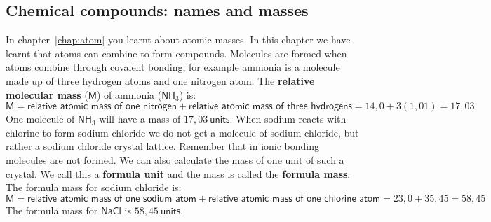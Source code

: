             \subsection*{Chemical compounds: names and masses}
            \nopagebreak
\label{m38689*uid97124}In chapter~\ref{chap:atom} you learnt about atomic masses. In this chapter we have learnt that atoms can combine to form compounds. Molecules are formed when atoms combine through covalent bonding, for example ammonia is a molecule made up of three hydrogen atoms and one nitrogen atom. The \textbf{relative molecular mass} ($\textsf{M}$) of ammonia ($\textsf{NH}_{3}$) is: \\
\begin{equation*}
 \textsf{M} = \textsf{relative atomic mass of one nitrogen} + \textsf{relative atomic mass of three hydrogens}
= 14,0 + 3(1,01) 
= 17,03
\end{equation*}
One molecule of $\textsf{NH}_{3}$ will have a  mass of $17,03~\textsf{units}$. When sodium reacts with chlorine to form sodium chloride we do not get a molecule of sodium chloride, but rather a sodium chloride crystal lattice. Remember that in ionic bonding molecules are not formed. We can also calculate the mass of one unit of such a crystal. We call this a \textbf{formula unit} and the mass is called the \textbf{formula mass}. The formula mass for sodium chloride is:
 \begin{equation*}
 \textsf{M} = \textsf{relative atomic mass of one sodium atom} + \textsf{relative atomic mass of one chlorine atom}
= 23,0 + 35,45 
= 58,45
\end{equation*} 
The formula mass for $\textsf{NaCl}$ is $58,45~\textsf{units}$.
      \label{m38689*secfhsst!!!underscore!!!id822}
